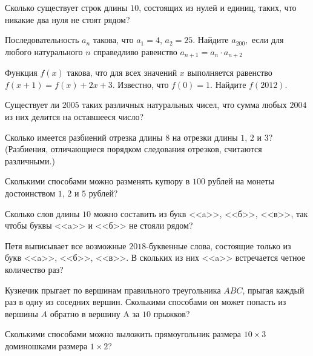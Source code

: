 \resetproblem \begingroup %
    \def\jeolmdate{16 ноября 2018 г.}%
\jeolmheader \endgroup


\begin{problems}

\item Сколько существует строк длины $10$, состоящих из нулей и единиц, таких, что никакие два нуля не стоят рядом?

\item Последовательность $a_n$ такова, что $a_1=4$, $a_2=25$. Найдите $a_{200},$ если для любого натурального $n$ справедливо равенство $a_{n+1}=a_n \cdot a_{n+2}$


\item Функция $f(x)$ такова, что для всех значений $x$ выполняется равенство  $f(x + 1) = f(x) + 2x + 3$.  Известно, что  $f(0) = 1$.  Найдите $f(2012)$.


\item Существует ли $2005$ таких различных натуральных чисел, что сумма любых $2004$ из них делится на оставшееся число?


\item Сколько имеется разбиений отрезка длины $8$ на отрезки длины $1$, $2$ и $3$? (Разбиения, отличающиеся порядком следования отрезков, считаются различными.)


\item Сколькими способами можно разменять купюру в $100$ рублей на монеты достоинством $1$, $2$ и $5$ рублей?


\item Сколько слов длины $10$ можно составить из букв <<a>>, <<б>>, <<в>>, так чтобы буквы <<a>> и <<б>> не стояли рядом?


\item Петя выписывает все возможные $2018$-буквенные слова, состоящие только из букв <<a>>, <<б>>, <<в>>. В скольких из них <<a>> встречается четное количество раз?



\item Кузнечик прыгает по вершинам правильного треугольника $ABC$, прыгая каждый раз в одну из соседних вершин. Сколькими способами он может попасть из вершины $A$ обратно в вершину A за $10$ прыжков?


\item Сколькими способами можно выложить прямоугольник размера $10\times 3$ доминошками размера $1\times 2$?






\end{problems}